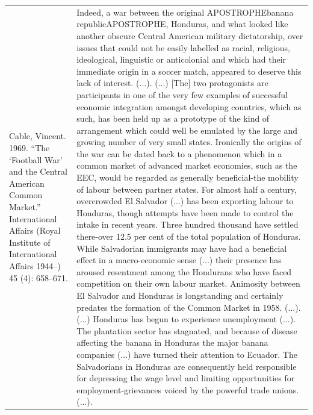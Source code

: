 {\begin{longtable}{p{}p{}}
\\
Cable, Vincent. 1969. “The ‘Football War’ and the Central American Common Market.” International Affairs (Royal Institute of International Affairs 1944–) 45 (4): 658–671. & Indeed, a war between the original APOSTROPHEbanana republicAPOSTROPHE, Honduras, and what looked like another obscure Central American military dictatorship, over issues that could not be easily labelled as racial, religious, ideological, linguistic or anticolonial and which had their immediate origin in a soccer match, appeared to deserve this lack of interest. (...). (...) [The] two protagonists are participants in one of the very few examples of successful economic integration amongst developing countries, which as such, has been held up as a prototype of the kind of arrangement which could well be emulated by the large and growing number of very small states. Ironically the origins of the war can be dated back to a phenomenon which in a common market of advanced market economies, such as the EEC, would be regarded as generally beneficial-the mobility of labour between partner states. For almost half a century, overcrowded El Salvador (...) has been exporting labour to Honduras, though attempts have been made to control the intake in recent years. Three hundred thousand have settled there-over 12.5 per cent of the total population of Honduras. While Salvadorian immigrants may have had a beneficial effect in a macro-economic sense (...) their presence has aroused resentment among the Hondurans who have faced competition on their own labour market. Animosity between El Salvador and Honduras is longstanding and certainly predates the formation of the Common Market in 1958. (...). (...) Honduras has begun to experience unemployment (...). The plantation sector has stagnated, and because of disease affecting the banana in Honduras the major banana companies (...) have turned their attention to Ecuador. The Salvadorians in Honduras are consequently held responsible for depressing the wage level and limiting opportunities for employment-grievances voiced by the powerful trade unions. (...). 

\end{longtable}}
